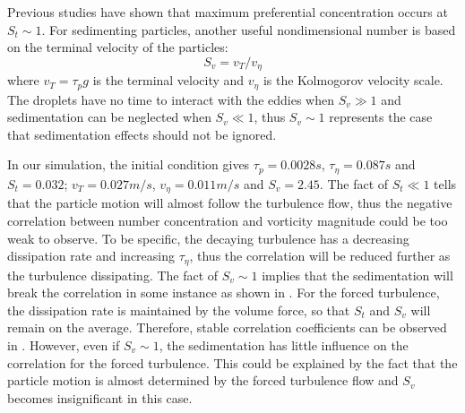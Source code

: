 Previous studies \cite{grabowski1999comments,vaillancourt2000review} have shown that maximum preferential concentration occurs at $S_t \sim 1$. For sedimenting particles, another useful nondimensional number is based on the terminal velocity of the particles:
\begin{equation}
S_v = v_T/v_{\eta}
\end{equation}
where $v_T = \tau_p g$ is the terminal velocity and $v_{\eta}$ is the Kolmogorov velocity scale. The droplets have no time to interact with the eddies when $S_v \gg 1$ and sedimentation can be neglected when $S_v \ll 1$, thus $S_v \sim 1$ represents the case that sedimentation effects should not be ignored.

In our simulation, the initial condition gives $\tau_p = 0.0028 s$, $\tau_\eta = 0.087s$ and $S_t = 0.032$; $v_T = 0.027 m/s$, $v_{\eta} = 0.011 m/s$ and $S_v = 2.45$. The fact of $S_t \ll 1$ tells that the particle motion will 
almost follow the turbulence flow, thus the negative correlation between number concentration and vorticity 
magnitude could be too weak to observe. To be specific, the decaying turbulence has a decreasing dissipation rate 
and increasing $\tau_{\eta}$, thus the correlation will be reduced further as the turbulence dissipating. The fact of $S_v \sim 1$ implies that the sedimentation will break the correlation in some instance as shown in . For the forced turbulence, the dissipation rate is maintained by the volume force, so that $S_t$ and $S_v$ will remain on the average. Therefore, stable correlation coefficients can be observed in . However, even if $S_v \sim 1$, the sedimentation has little influence on the correlation for the forced turbulence. This could be explained by the fact that the particle motion is almost determined by the forced turbulence flow and $S_v$ becomes insignificant in this case.   

